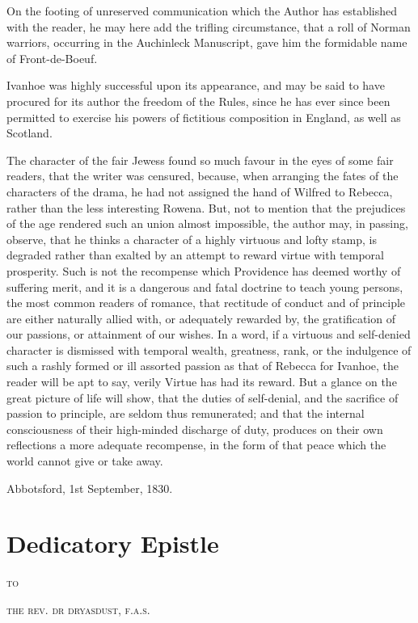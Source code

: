 On the footing of unreserved communication which the Author has
established with the reader, he may here add the trifling circumstance,
that a roll of Norman warriors, occurring in the Auchinleck Manuscript,
gave him the formidable name of Front-de-Boeuf.

Ivanhoe was highly successful upon its appearance, and may be said to
have procured for its author the freedom of the Rules, since he has ever
since been permitted to exercise his powers of fictitious composition in
England, as well as Scotland.

The character of the fair Jewess found so much favour in the eyes of
some fair readers, that the writer was censured, because, when arranging
the fates of the characters of the drama, he had not assigned the hand
of Wilfred to Rebecca, rather than the less interesting Rowena. But, not
to mention that the prejudices of the age rendered such an union almost
impossible, the author may, in passing, observe, that he thinks a
character of a highly virtuous and lofty stamp, is degraded rather than
exalted by an attempt to reward virtue with temporal prosperity. Such is
not the recompense which Providence has deemed worthy of suffering
merit, and it is a dangerous and fatal doctrine to teach young persons,
the most common readers of romance, that rectitude of conduct and of
principle are either naturally allied with, or adequately rewarded by,
the gratification of our passions, or attainment of our wishes. In a
word, if a virtuous and self-denied character is dismissed with temporal
wealth, greatness, rank, or the indulgence of such a rashly formed or
ill assorted passion as that of Rebecca for Ivanhoe, the reader will be
apt to say, verily Virtue has had its reward. But a glance on the great
picture of life will show, that the duties of self-denial, and the
sacrifice of passion to principle, are seldom thus remunerated; and that
the internal consciousness of their high-minded discharge of duty,
produces on their own reflections a more adequate recompense, in the
form of that peace which the world cannot give or take away.

\noindent Abbotsford, 1st September, 1830.

\chapter{Dedicatory Epistle}

\MakeLowercase{\textsc{TO}}

\noindent\MakeLowercase{\textsc{THE REV. DR DRYASDUST, F.A.S.}}

